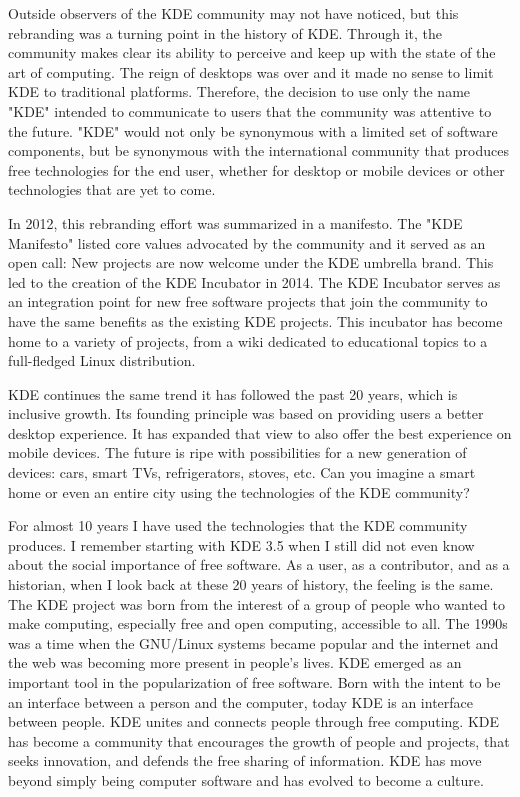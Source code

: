 Outside observers of the KDE community may not have noticed, but this rebranding was a turning point in the history of KDE. Through it, the community makes clear its ability to perceive and keep up with the state of the art of computing. The reign of desktops was over and it made no sense to limit KDE to traditional platforms. Therefore, the decision to use only the name "KDE" intended to communicate to users that the community was attentive to the future. "KDE" would not only be synonymous with a limited set of software components, but be synonymous with the international community that produces free technologies for the end user, whether for desktop or mobile devices or other technologies that are yet to come. 

In 2012, this rebranding effort was summarized in a manifesto. The "KDE Manifesto" listed core values advocated by the community and it served as an open call: New projects are now welcome under the KDE umbrella brand. This led to the creation of the KDE Incubator in 2014. The KDE Incubator serves as an integration point for new free software projects that join the community to have the same benefits as the existing KDE projects. This incubator has become home to a variety of projects, from a wiki dedicated to educational topics to a full-fledged Linux distribution. 

KDE continues the same trend it has followed the past 20 years, which is inclusive growth. Its founding principle was based on providing users a better desktop experience. It has expanded that view to also offer the best experience on mobile devices. The future is ripe with possibilities for a new generation of devices: cars, smart TVs, refrigerators, stoves, etc. Can you imagine a smart home or even an entire city using the technologies of the KDE community? 

For almost 10 years I have used the technologies that the KDE community produces. I remember starting with KDE 3.5 when I still did not even know about the social importance of free software. As a user, as a contributor, and as a historian, when I look back at these 20 years of history, the feeling is the same. The KDE project was born from the interest of a group of people who wanted to make computing, especially free and open computing, accessible to all. The 1990s was a time when the GNU/Linux systems became popular and the internet and the web was becoming more present in people's lives. KDE emerged as an important tool in the popularization of free software. Born with the intent to be an interface between a person and the computer, today KDE is an interface between people. KDE unites and connects people through free computing. KDE has become a community that encourages the growth of people and projects, that seeks innovation, and defends the free sharing of information. KDE has move beyond simply being computer software and has evolved to become a culture.

